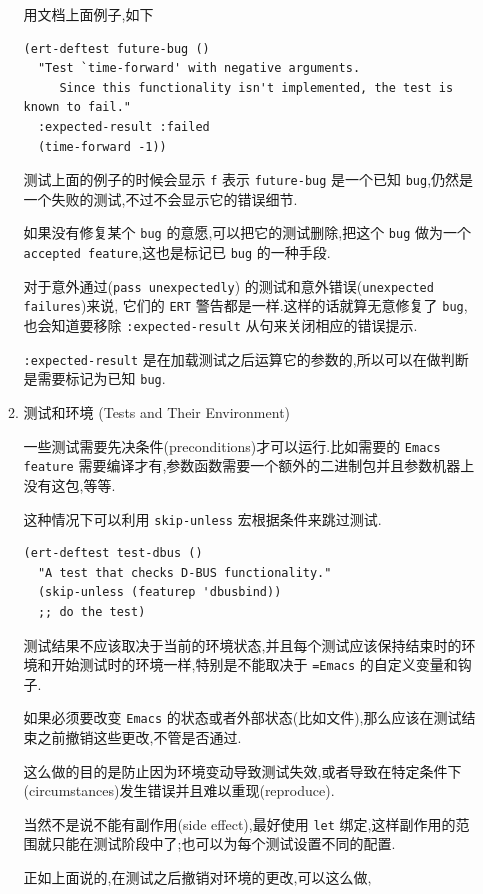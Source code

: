 \documentclass[11pt]{article}
\begin{document}
\begin{enumerate}
\begin{enumerate}
用文档上面例子,如下

\begin{verbatim}
(ert-deftest future-bug ()
  "Test `time-forward' with negative arguments.
     Since this functionality isn't implemented, the test is known to fail."
  :expected-result :failed
  (time-forward -1))
\end{verbatim}

测试上面的例子的时候会显示 \texttt{f} 表示 \texttt{future-bug} 是一个已知 \texttt{bug},仍然是一个失败的测试,不过不会显示它的错误细节.

如果没有修复某个 \texttt{bug} 的意愿,可以把它的测试删除,把这个 \texttt{bug} 做为一个 \texttt{accepted feature},这也是标记已 \texttt{bug} 的一种手段.

对于意外通过(\texttt{pass unexpectedly}) 的测试和意外错误(\texttt{unexpected failures})来说, 它们的 \texttt{ERT} 警告都是一样.这样的话就算无意修复了 \texttt{bug},也会知道要移除 \texttt{:expected-result} 从句来关闭相应的错误提示.

\texttt{:expected-result} 是在加载测试之后运算它的参数的,所以可以在做判断是需要标记为已知 \texttt{bug}.


\item 测试和环境 (Tests and Their Environment)
\label{sec:orgb6e23c8}

一些测试需要先决条件(preconditions)才可以运行.比如需要的 \texttt{Emacs feature} 需要编译才有,参数函数需要一个额外的二进制包并且参数机器上没有这包,等等.

这种情况下可以利用 \texttt{skip-unless} 宏根据条件来跳过测试.

\begin{verbatim}
(ert-deftest test-dbus ()
  "A test that checks D-BUS functionality."
  (skip-unless (featurep 'dbusbind))
  ;; do the test)
\end{verbatim}

测试结果不应该取决于当前的环境状态,并且每个测试应该保持结束时的环境和开始测试时的环境一样,特别是不能取决于 \texttt{=Emacs} 的自定义变量和钩子.

如果必须要改变 \texttt{Emacs} 的状态或者外部状态(比如文件),那么应该在测试结束之前撤销这些更改,不管是否通过.

这么做的目的是防止因为环境变动导致测试失效,或者导致在特定条件下(circumstances)发生错误并且难以重现(reproduce).

当然不是说不能有副作用(side effect),最好使用 \texttt{let} 绑定,这样副作用的范围就只能在测试阶段中了;也可以为每个测试设置不同的配置.

正如上面说的,在测试之后撤销对环境的更改,可以这么做,


\end{enumerate}
\end{enumerate}
\end{document}
